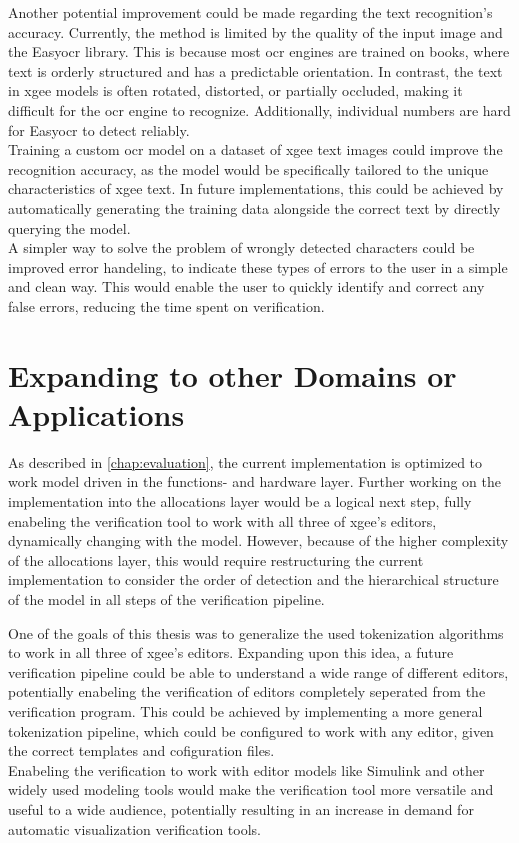 Another potential improvement could be made regarding the text recognition's accuracy. Currently, the method is limited by the quality of the input image and the Easy\acrshort{ocr} library. This is because most \acrshort{ocr} engines are trained on books, where text is orderly structured and has a predictable orientation. In contrast, the text in \acrshort{xgee} models is often rotated, distorted, or partially occluded, making it difficult for the \acrshort{ocr} engine to recognize. Additionally, individual numbers are hard for Easy\acrshort{ocr} to detect reliably.\\
Training a custom \acrshort{ocr} model on a dataset of \acrshort{xgee} text images could improve the recognition accuracy, as the model would be specifically tailored to the unique characteristics of \acrshort{xgee} text. In future implementations, this could be achieved by automatically generating the training data alongside the correct text by directly querying the model.\\
A simpler way to solve the problem of wrongly detected characters could be improved error handeling, to indicate these types of errors to the user in a simple and clean way. This would enable the user to quickly identify and correct any false errors, reducing the time spent on verification.

\section{Expanding to other Domains or Applications}
\label{sec:expanding_to_other_domains}
As described in \autoref{chap:evaluation}, the current implementation is optimized to work model driven in the functions- and hardware layer. Further working on the implementation into the allocations layer would be a logical next step, fully enabeling the verification tool to work with all three of \acrshort{xgee}'s editors, dynamically changing with the model. However, because of the higher complexity of the allocations layer, this would require restructuring the current implementation to consider the order of detection and the hierarchical structure of the model in all steps of the verification pipeline.

One of the goals of this thesis was to generalize the used tokenization algorithms to work in all three of \acrshort{xgee}'s editors. Expanding upon this idea, a future verification pipeline could be able to understand a wide range of different editors, potentially enabeling the verification of editors completely seperated from the verification program. This could be achieved by implementing a more general tokenization pipeline, which could be configured to work with any editor, given the correct templates and cofiguration files.\\
Enabeling the verification to work with editor models like Simulink and other widely used modeling tools would make the verification tool more versatile and useful to a wide audience, potentially resulting in an increase in demand for automatic visualization verification tools.